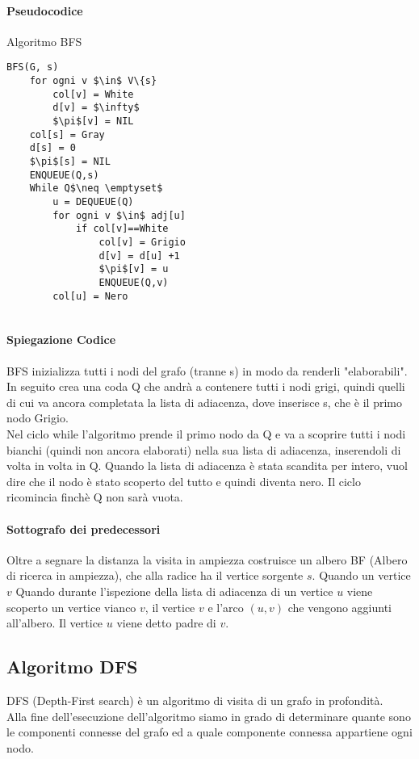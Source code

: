 \documentclass[12pt, a4paper, openany]{book}
\begin{document}
\paragraph{Pseudocodice} Algoritmo BFS
\begin{lstlisting}[mathescape=true]
BFS(G, s)
    for ogni v $\in$ V\{s}
        col[v] = White
        d[v] = $\infty$
        $\pi$[v] = NIL
    col[s] = Gray
    d[s] = 0
    $\pi$[s] = NIL
    ENQUEUE(Q,s)
    While Q$\neq \emptyset$
        u = DEQUEUE(Q)
        for ogni v $\in$ adj[u]
            if col[v]==White
                col[v] = Grigio
                d[v] = d[u] +1
                $\pi$[v] = u
                ENQUEUE(Q,v)
        col[u] = Nero
    
\end{lstlisting}
\paragraph{Spiegazione Codice}
BFS inizializza tutti i nodi del grafo (tranne s) in modo da renderli "elaborabili".
In seguito crea una coda Q che andrà a contenere tutti i nodi grigi, quindi quelli di cui va ancora completata la lista di adiacenza,
dove inserisce s, che è il primo nodo Grigio.
\\Nel ciclo while l'algoritmo prende il primo nodo da Q e va a scoprire tutti i nodi bianchi (quindi non ancora elaborati) nella sua lista di adiacenza,
inserendoli di volta in volta in Q. Quando la lista di adiacenza è stata scandita per intero, vuol dire che il nodo è stato scoperto del tutto e quindi diventa nero.
Il ciclo ricomincia finchè Q non sarà vuota.


\paragraph{Sottografo dei predecessori}
Oltre a segnare la distanza la visita in ampiezza costruisce un albero BF (Albero di ricerca in ampiezza), che alla radice ha il vertice sorgente $s$. Quando un vertice $v$
Quando durante l'ispezione della lista di adiacenza di un vertice $u$ viene scoperto un vertice vianco $v$,
il vertice $v$ e l'arco $(u,v)$ che vengono aggiunti all'albero. Il vertice $u$ viene detto padre di $v$.


\subsection{Algoritmo DFS}
DFS (Depth-First search) è un algoritmo di visita di un grafo in profondità.
\\Alla fine dell'esecuzione dell'algoritmo siamo in grado di determinare quante sono le componenti connesse
del grafo ed a quale componente connessa appartiene ogni nodo.
\end{document}

